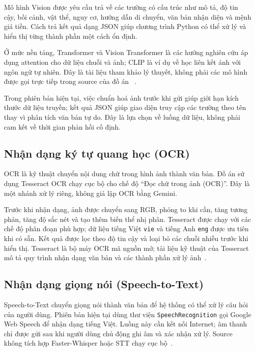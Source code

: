 Mô hình Vision được yêu cầu trả về các trường có cấu trúc như mô tả, độ tin
cậy, bối cảnh, vật thể, nguy cơ, hướng dẫn di chuyển, văn bản nhận diện và
mệnh giá tiền. Cách trả kết quả dạng JSON giúp chương trình Python có thể xử
lý và hiển thị từng thành phần một cách ổn định.

Ở mức nền tảng, Transformer và Vision Transformer là các hướng nghiên cứu áp
dụng attention cho dữ liệu chuỗi và ảnh; CLIP là ví dụ về học liên kết ảnh với
ngôn ngữ tự nhiên. Đây là tài liệu tham khảo lý thuyết, không phải các mô hình
được gọi trực tiếp trong source của đồ án
~\cite{Vaswani2017Attention,Dosovitskiy2021ViT,Radford2021CLIP}.

Trong phiên bản hiện tại, việc chuẩn hoá ảnh trước khi gửi giúp giới hạn kích
thước dữ liệu truyền; kết quả JSON giúp giao diện truy cập các trường theo
tên thay vì phân tích văn bản tự do. Đây là lựa chọn về luồng dữ liệu, không
phải cam kết về thời gian phản hồi cố định.

\subsection{Nhận dạng ký tự quang học (OCR)}

OCR  là kỹ thuật chuyển nội dung chữ
trong hình ảnh thành văn bản. Đồ án sử dụng Tesseract OCR chạy cục bộ cho
chế độ ``Đọc chữ trong ảnh (OCR)''. Đây là một nhánh xử lý riêng, không giả
lập OCR bằng Gemini.

Trước khi nhận dạng, ảnh được chuyển sang RGB, phóng to khi cần, tăng tương
phản, tăng độ sắc nét và tạo thêm biến thể nhị phân. Tesseract được chạy với
các chế độ phân đoạn phù hợp; dữ liệu tiếng Việt \texttt{vie} và tiếng Anh \texttt{eng} được
ưu tiên khi có sẵn. Kết quả được lọc theo độ tin cậy và loại bỏ các chuỗi
nhiễu trước khi hiển thị. Tesseract là bộ máy OCR mã nguồn mở; tài liệu kỹ
thuật của Tesseract mô tả quy trình nhận dạng văn bản và các thành phần xử lý
ảnh~\cite{Smith2007Tesseract,TesseractDocumentation2026}.

\subsection{Nhận dạng giọng nói (Speech-to-Text)}

Speech-to-Text  chuyển giọng nói thành văn bản để hệ thống có thể
xử lý câu hỏi của người dùng. Phiên bản hiện tại dùng thư viện
\texttt{SpeechRecognition} gọi Google Web Speech để nhận dạng tiếng Việt.
Luồng này cần kết nối Internet; âm thanh chỉ được gửi sau khi người dùng chủ
động ghi âm và xác nhận xử lý. Source không tích hợp Faster-Whisper hoặc STT
chạy cục bộ~\cite{SpeechRecognitionPackage2026}.

